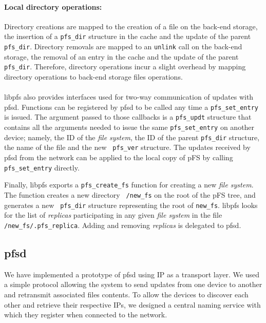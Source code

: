 \paragraph{Local directory operations:}
Directory creations are mapped to the creation of a file on the
back-end storage, the insertion of a {\tt pfs\_dir} structure in the
cache and the update of the parent {\tt pfs\_dir}. Directory removals
are mapped to an {\tt unlink} call on the back-end storage, the
removal of an entry in the cache and the update of the parent {\tt
  pfs\_dir}. Therefore, directory operations incur a slight overhead
by mapping directory operations to back-end storage files operations.

\paragraph{}
libpfs also provides interfaces used for two-way communication of
updates with pfsd. Functions can be registered by pfsd to be called
any time a {\tt pfs\_set\_entry} is issued. The argument passed to
those callbacks is a {\tt pfs\_updt} structure that contains all the
arguments needed to issue the same {\tt pfs\_set\_entry} on another
device; namely, the ID of the \emph{file system}, the ID of the parent
{\tt pfs\_dir} structure, the name of the file and the new {\tt
  pfs\_ver} structure. The updates received by pfsd from the network
can be applied to the local copy of pFS by calling {\tt
  pfs\_set\_entry} directly.

Finally, libpfs exports a {\tt pfs\_create\_fs} function for creating
a new \emph{file system}. The function creates a new directory {\tt
  /new\_fs} on the root of the pFS tree, and generates a new {\tt
  pfs\_dir} structure representing the root of {\tt new\_fs}. libpfs
looks for the list of \emph{replicas} participating in any given
\emph{file system} in the file {\tt /new\_fs/.pfs\_replica}. Adding
and removing \emph{replicas} is delegated to pfsd.

\subsection {pfsd}

We have implemented a prototype of pfsd using IP as a transport layer.
We used a simple protocol allowing the system to send updates from one
device to another and retransmit associated files contents. To allow
the devices to discover each other and retrieve their respective IPs,
we designed a central naming service with which they register when
connected to the network.

